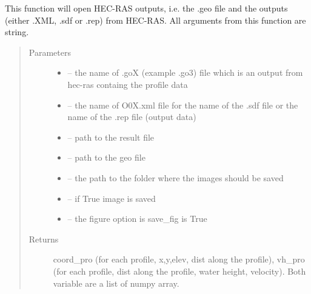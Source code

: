 \documentclass[letterpaper,10pt,english]{sphinxmanual}
\begin{document}
\begin{fulllineitems}
\label{\detokenize{index:src.Hec_ras06.open_hecras}}
This function will open HEC-RAS outputs, i.e. the .geo file and the outputs (either .XML, .sdf or .rep) from HEC-RAS.
All arguments from this function are string.
\begin{quote}\begin{description}
\item[{Parameters}] \leavevmode\begin{itemize}
\item {} 
 -- the name of .goX (example .go3) file which is an output from hec-ras containg the profile data

\item {} 
 -- the name of O0X.xml file for the name of the .sdf file  or the name of the .rep file (output data)

\item {} 
 -- path to the result file

\item {} 
 -- path to the geo file

\item {} 
 -- the path to the folder where the images should be saved

\item {} 
 -- if True image is saved

\item {} 
 -- the figure option is save\_fig is True

\end{itemize}

\item[{Returns}] \leavevmode
coord\_pro (for each profile, x,y,elev, dist along the profile), vh\_pro
(for each profile, dist along the profile, water height, velocity). Both variable are a list of numpy array.

\end{description}\end{quote}



\end{fulllineitems}
\end{document}
